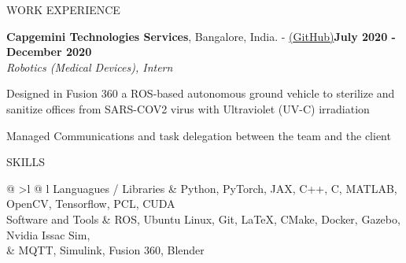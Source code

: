 \documentclass{resume} %
\begin{document}
\begin{rSection}{WORK EXPERIENCE}
	\begin{rSubsectiond}{\textbf{Capgemini Technologies Services}, Bangalore, India. - \href{https://github.com/Sahas-Ananth/ROS-ASV}{(GitHub)}}{\textbf{July 2020 - December 2020} \\\textit{Robotics (Medical Devices), Intern}}
	\item Designed in Fusion 360 a ROS-based autonomous ground vehicle to sterilize and sanitize offices from SARS-COV2 virus with Ultraviolet (UV-C) irradiation
	\item Managed Communications and task delegation between the team and the client
	\end{rSubsectiond}

    \end{rSection}
\vspace{-3mm}
    \begin{rSection}{SKILLS}
	\begin{tabular}{ @ {} >{\bfseries}l @{\hspace{3ex}} l }
	    Languagues / Libraries &  Python, PyTorch, JAX, C++, C, MATLAB, OpenCV, Tensorflow, PCL, CUDA\\
	    Software and Tools & ROS, Ubuntu Linux, Git, LaTeX, CMake, Docker, Gazebo, Nvidia Issac Sim, \\
	    & MQTT, Simulink, Fusion 360, Blender\\
	\end{tabular}
    \end{rSection}
\vspace{-3.5mm}
\end{document}
